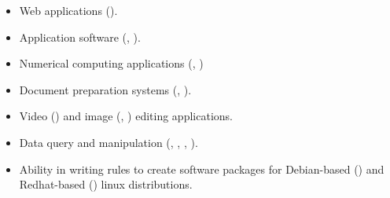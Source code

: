 \begin{cvskills}
{\hfill
\begin{minipage}{0.48\textwidth}
\vspace{0.3em}
\begin{itemize}[labelwidth=\the\widest,align=right,leftmargin=!,labelsep=1pt,noitemsep]
\item[\custItem] Web applications (\textsc{\color{awesome}{Angular}}).
\item[\custItem] Application software (\textsc{\color{awesome}{Microsoft Office}},
\textsc{\color{awesome}{Google Doc Suite}}).
\item[\custItem] Numerical computing applications
(\textsc{\color{awesome}{Matlab}}, \textsc{\color{awesome}{Mathematica}})
\item[\custItem] Document preparation systems ({\color{awesome}{\LaTeX}},
{\color{awesome}{\TeX}}).
\item[\custItem] Video (\textsc{\color{awesome}{Adobe Premiere}}) and
image (\textsc{\color{awesome}{Adobe Photoshop}},
\textsc{\color{awesome}{Gimp}}) editing applications.
\item[\custItem] Data query and manipulation (\textsc{\color{awesome}{sql}}, 
\textsc{\color{awesome}{json}}, \textsc{\color{awesome}{xml}},
\textsc{\color{awesome}{csv}}).
\item[\custItem] Ability in writing rules to create software packages for
Debian-based (\textsc{\color{awesome}{deb}}) and Redhat-based
(\textsc{\color{awesome}{rpm}}) linux distributions.
\end{itemize}
\end{minipage}
}


\end{cvskills}
